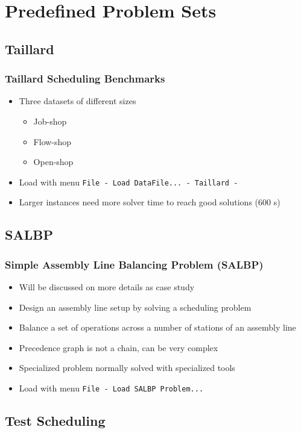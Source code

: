 \section{Predefined Problem Sets}
\subsection{Taillard}

\begin{frame}
\frametitle{Taillard Scheduling Benchmarks}
\begin{itemize}
\item Three datasets of different sizes
\begin{itemize}
\item Job-shop
\item Flow-shop
\item Open-shop
\end{itemize}
\item Load with menu \texttt{File - Load DataFile... - Taillard - }
\item Larger instances need more solver time to reach good solutions (600 s)
\end{itemize}
\end{frame}


\subsection{SALBP}

\begin{frame}
\frametitle{Simple Assembly Line Balancing Problem (SALBP)}
\begin{itemize}
\item Will be discussed on more details as case study
\item Design an assembly line setup by solving a scheduling problem
\item Balance a set of operations across a number of stations of an assembly line
\item Precedence graph is not a chain, can be very complex
\item Specialized problem normally solved with specialized tools
\item Load with menu \texttt{File - Load SALBP Problem...}
\end{itemize}
\end{frame}


\subsection{Test Scheduling}

